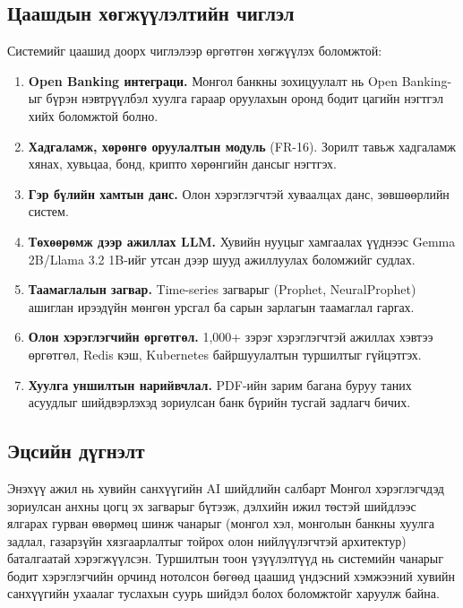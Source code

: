 \subsection*{Цаашдын хөгжүүлэлтийн чиглэл}

Системийг цаашид доорх чиглэлээр өргөтгөн хөгжүүлэх боломжтой:
\begin{enumerate}
    \item \textbf{Open Banking интеграци.} Монгол банкны зохицуулалт нь Open Banking-ыг бүрэн нэвтрүүлбэл хуулга гараар оруулахын оронд бодит цагийн нэгтгэл хийх боломжтой болно.
    \item \textbf{Хадгаламж, хөрөнгө оруулалтын модуль} (FR-16). Зорилт тавьж хадгаламж хянах, хувьцаа, бонд, крипто хөрөнгийн дансыг нэгтгэх.
    \item \textbf{Гэр бүлийн хамтын данс.} Олон хэрэглэгчтэй хуваалцах данс, зөвшөөрлийн систем.
    \item \textbf{Төхөөрөмж дээр ажиллах LLM.} Хувийн нууцыг хамгаалах үүднээс Gemma 2B/Llama 3.2 1B-ийг утсан дээр шууд ажиллуулах боломжийг судлах.
    \item \textbf{Таамаглалын загвар.} Time-series загварыг (Prophet, NeuralProphet) ашиглан ирээдүйн мөнгөн урсгал ба сарын зарлагын таамаглал гаргах.
    \item \textbf{Олон хэрэглэгчийн өргөтгөл.} 1{,}000+ зэрэг хэрэглэгчтэй ажиллах хэвтээ өргөтгөл, Redis кэш, Kubernetes байршуулалтын туршилтыг гүйцэтгэх.
    \item \textbf{Хуулга уншилтын нарийвчлал.} PDF-ийн зарим багана буруу таних асуудлыг шийдвэрлэхэд зориулсан банк бүрийн тусгай задлагч бичих.
\end{enumerate}

\subsection*{Эцсийн дүгнэлт}

Энэхүү ажил нь хувийн санхүүгийн AI шийдлийн салбарт Монгол хэрэглэгчдэд зориулсан анхны цогц эх загварыг бүтээж, дэлхийн ижил төстэй шийдлээс ялгарах гурван өвөрмөц шинж чанарыг (монгол хэл, монголын банкны хуулга задлал, газарзүйн хязгаарлалтыг тойрох олон нийлүүлэгчтэй архитектур) баталгаатай хэрэгжүүлсэн. Туршилтын тоон үзүүлэлтүүд нь системийн чанарыг бодит хэрэглэгчийн орчинд нотолсон бөгөөд цаашид үндэсний хэмжээний хувийн санхүүгийн ухаалаг туслахын суурь шийдэл болох боломжтойг харуулж байна.
